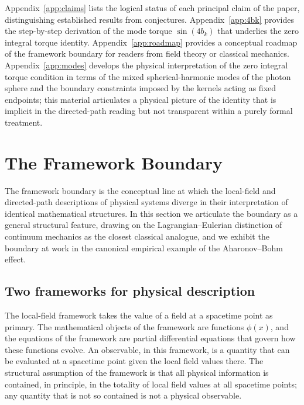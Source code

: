 \documentclass[%
 reprint, amsmath,amssymb, aps, prb, ]{revtex4-2}
\numberwithin{equation}{section}
\begin{document}
Appendix~\ref{app:claims} lists the logical status of each principal claim of the paper, distinguishing established results from conjectures. Appendix~\ref{app:4bk} provides the step-by-step derivation of the mode torque $\sin(4b_k)$ that underlies the zero integral torque identity. Appendix~\ref{app:roadmap} provides a conceptual roadmap of the framework boundary for readers from field theory or classical mechanics. Appendix~\ref{app:modes} develops the physical interpretation of the zero integral torque condition in terms of the mixed spherical-harmonic modes of the photon sphere and the boundary constraints imposed by the kernels acting as fixed endpoints; this material articulates a physical picture of the identity that is implicit in the directed-path reading but not transparent within a purely formal treatment.


\section{The Framework Boundary}
\label{sec:framework_boundary}

The framework boundary is the conceptual line at which the local-field and directed-path descriptions of physical systems diverge in their interpretation of identical mathematical structures. In this section we articulate the boundary as a general structural feature, drawing on the Lagrangian--Eulerian distinction of continuum mechanics as the closest classical analogue, and we exhibit the boundary at work in the canonical empirical example of the Aharonov--Bohm effect.

\subsection{Two frameworks for physical description}
\label{sec:two_frameworks}

The local-field framework takes the value of a field at a spacetime point as primary. The mathematical objects of the framework are functions $\phi(x)$, and the equations of the framework are partial differential equations that govern how these functions evolve. An observable, in this framework, is a quantity that can be evaluated at a spacetime point given the local field values there. The structural assumption of the framework is that all physical information is contained, in principle, in the totality of local field values at all spacetime points; any quantity that is not so contained is not a physical observable.
\end{document}
